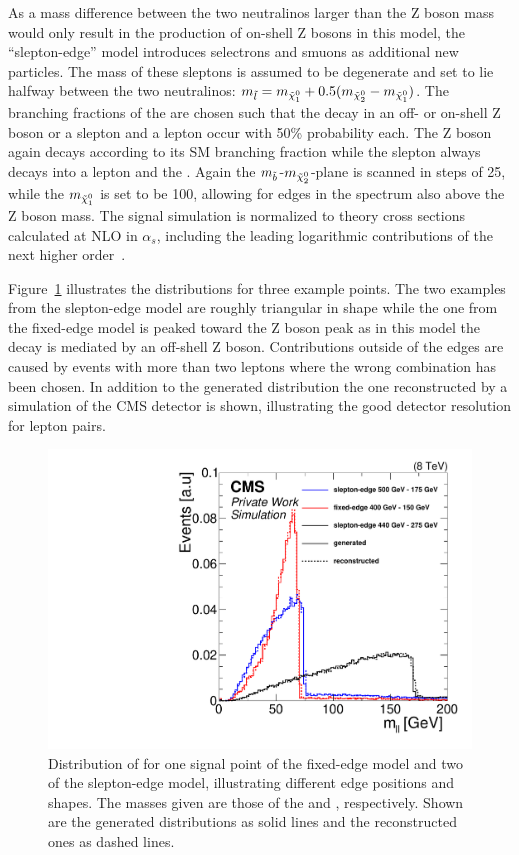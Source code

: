 As a mass difference between the two neutralinos larger than the Z boson mass would only result in the production of on-shell Z bosons in this model, the ``slepton-edge'' model introduces selectrons and smuons as additional new particles. The mass of these sleptons is assumed to be degenerate and set to lie halfway between the two neutralinos: $m_{\tilde{l}} = m_{{\tilde{\chi}^0_1}} + 0.5(m_{{\tilde{\chi}^0_2}}-m_{{\tilde{\chi}^0_1}})$. The branching fractions of the \secondchi are chosen such that the decay in an off- or on-shell Z boson or a slepton and a lepton occur with 50\% probability each. The Z boson again decays according to its SM branching fraction while the slepton always decays into a lepton and the \firstchi. Again the $m_{\tilde{b}}$-$m_{{\tilde{\chi}^0_2}}$-plane is scanned in steps of 25\GeV, while the $m_{{\tilde{\chi}^0_1}}$ is set to be 100\GeV, allowing for edges in the \mll spectrum also above the Z boson mass. 
The signal simulation is normalized to theory cross sections calculated at NLO in $\alpha_s$, including the leading logarithmic contributions of the next higher order~\cite{bib-nlo-nll-01,bib-nlo-nll-02,bib-nlo-nll-03,bib-nlo-nll-04,bib-nlo-nll-05,ref:xsec}.

Figure~\ref{fig:SUSYMasses} illustrates the \mll distributions for three example points. The two examples from the slepton-edge model are roughly triangular in shape while the one from the fixed-edge model is peaked toward the Z boson peak as in this model the decay is mediated by an off-shell Z boson. Contributions outside of the edges are caused by events with more than two leptons where the wrong combination has been chosen. In addition to the generated distribution the one reconstructed by a simulation of the CMS detector is shown, illustrating the good detector resolution for lepton pairs.
\begin{figure}
\centering
\includegraphics[scale=0.3]{plots/THEO/SUSY_masses.pdf}
\caption{Distribution of \mll for one signal point of the fixed-edge model and two of the slepton-edge model, illustrating different edge positions and shapes. The masses given are those of the \sbottom and \secondchi, respectively. Shown are the generated distributions as solid lines and the reconstructed ones as dashed lines.}
\label{fig:SUSYMasses}
\end{figure}

     
